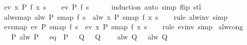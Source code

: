 \begin{isabellebody}
\ {\isachardoublequoteopen}ev\ {\isacharparenleft}{\isasymlambda}x{\isachardot}\ P\ {\isacharparenleft}f\ x{\isacharparenright}{\isacharparenright}\ s{\isachardoublequoteclose}\ \isamarkupfalse%
\ \isamarkupfalse%
\ {\isachardoublequoteopen}ev\ P\ {\isacharparenleft}f\ s{\isacharparenright}{\isachardoublequoteclose}\isanewline
\ \ \ \ \isamarkupfalse%
\ induction\ {\isacharparenleft}auto\ simp\ flip{\isacharcolon}\ stl{\isacharparenright}\isanewline
{}\isamarkupfalse%
%
\endisatagproof
{\isafoldproof}%
%
\isadelimproof
\isanewline
%
\endisadelimproof
\isanewline
{}\isamarkupfalse%
\ alw{\isacharunderscore}smap{\isacharcolon}\ {\isachardoublequoteopen}alw\ P\ {\isacharparenleft}smap\ f\ s{\isacharparenright}\ {\isasymlongleftrightarrow}\ alw\ {\isacharparenleft}{\isasymlambda}x{\isachardot}\ P\ {\isacharparenleft}smap\ f\ x{\isacharparenright}{\isacharparenright}\ s{\isachardoublequoteclose}\isanewline
%
\isadelimproof
\ \ %
\endisadelimproof
%
\isatagproof
{}\isamarkupfalse%
\ {\isacharparenleft}rule\ alw{\isacharunderscore}inv{\isacharparenright}\ simp%
\endisatagproof
{\isafoldproof}%
%
\isadelimproof
\isanewline
%
\endisadelimproof
\isanewline
{}\isamarkupfalse%
\ ev{\isacharunderscore}smap{\isacharcolon}\ {\isachardoublequoteopen}ev\ P\ {\isacharparenleft}smap\ f\ s{\isacharparenright}\ {\isasymlongleftrightarrow}\ ev\ {\isacharparenleft}{\isasymlambda}x{\isachardot}\ P\ {\isacharparenleft}smap\ f\ x{\isacharparenright}{\isacharparenright}\ s{\isachardoublequoteclose}\isanewline
%
\isadelimproof
\ \ %
\endisadelimproof
%
\isatagproof
{}\isamarkupfalse%
\ {\isacharparenleft}rule\ ev{\isacharunderscore}inv{\isacharparenright}\ simp%
\endisatagproof
{\isafoldproof}%
%
\isadelimproof
\isanewline
%
\endisadelimproof
\isanewline
{}\isamarkupfalse%
\ alw{\isacharunderscore}cong{\isacharcolon}\isanewline
\ \ \ P{\isacharcolon}\ {\isachardoublequoteopen}alw\ P\ {\isasymomega}{\isachardoublequoteclose}\ \ eq{\isacharcolon}\ {\isachardoublequoteopen}{\isasymAnd}{\isasymomega}{\isachardot}\ P\ {\isasymomega}\ {\isasymLongrightarrow}\ Q{}\ {\isasymomega}\ {\isasymlongleftrightarrow}\ Q{}\ {\isasymomega}{\isachardoublequoteclose}\isanewline
\ \ \ {\isachardoublequoteopen}alw\ Q{}\ {\isasymomega}\ {\isasymlongleftrightarrow}\ alw\ Q{}\ {\isasymomega}{\isachardoublequoteclose}\isanewline
%
\isadelimproof
%
\endisadelimproof
%
\isatagproof

\end{isabellebody}
